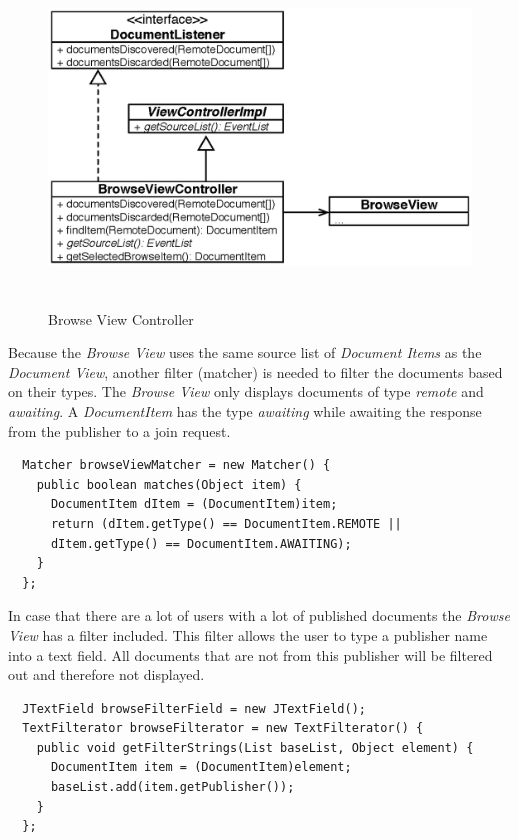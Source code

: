 \begin{figure}[H]
\begin{center}
  \includegraphics[height=3.5in, width=5.62in]{../images/finalreport/application_browseview.eps}
\caption{Browse View Controller}
\label{application_browseview}
\end{center}
\end{figure}

Because the \textit{Browse View} uses the same source list of \textit{Document Items} as the \textit{Document View}, another filter (matcher) is needed to filter the documents based on their types. The \textit{Browse View} only displays documents of type \emph{remote} and \emph{awaiting}. A \textit{Document\-Item} has the type \emph{awaiting} while awaiting the response from the publisher to a join request.

\begin{verbatim}
  Matcher browseViewMatcher = new Matcher() {
    public boolean matches(Object item) {
      DocumentItem dItem = (DocumentItem)item;
      return (dItem.getType() == DocumentItem.REMOTE ||
      dItem.getType() == DocumentItem.AWAITING);
    }
  };
\end{verbatim}

In case that there are a lot of users with a lot of published documents the \textit{Browse View} has a filter included. This filter allows the user to type a publisher name into a text field. All documents that are not from this publisher will be filtered out and therefore not displayed.
\begin{verbatim}
  JTextField browseFilterField = new JTextField();
  TextFilterator browseFilterator = new TextFilterator() {
    public void getFilterStrings(List baseList, Object element) {
      DocumentItem item = (DocumentItem)element;
      baseList.add(item.getPublisher());
    }
  };
\end{verbatim}

